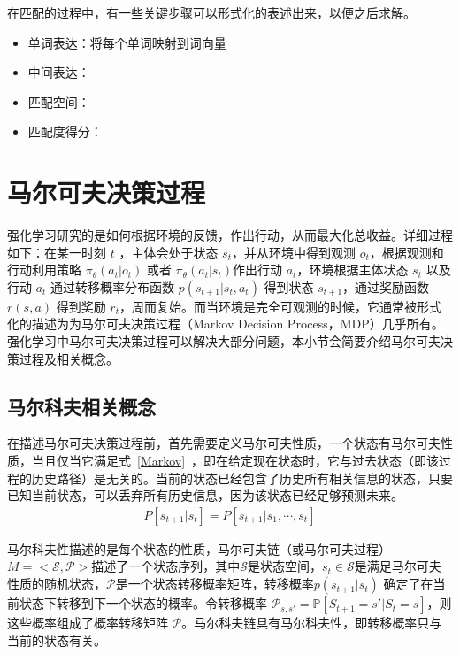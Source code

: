 在匹配的过程中，有一些关键步骤可以形式化的表述出来，以便之后求解。

\begin{itemize}
	\item 单词表达：将每个单词映射到词向量 
	\item 中间表达：
	\item 匹配空间：
	\item 匹配度得分：
\end{itemize}

\section{马尔可夫决策过程}
强化学习研究的是如何根据环境的反馈，作出行动，从而最大化总收益。详细过程如下：在某一时刻 $t$ ，主体会处于状态 $s_t$，并从环境中得到观测 $o_t$，根据观测和行动利用策略 $\pi_\theta(a_t|o_t)$ 或者 $\pi_\theta(a_t|s_t)$作出行动 $a_t$，环境根据主体状态 $s_t$ 以及行动 $a_t$ 通过转移概率分布函数 $p(s_{t+1}| s_t, a_t)$ 得到状态 $s_{t+1}$，通过奖励函数 $r(s, a)$ 得到奖励 $r_t$，周而复始。而当环境是完全可观测的时候，它通常被形式化的描述为为马尔可夫决策过程（Markov Decision Process，MDP）几乎所有。强化学习中马尔可夫决策过程可以解决大部分问题\cite{Sutton1998ReinFORcementL}，本小节会简要介绍马尔可夫决策过程及相关概念。

\subsection{马尔科夫相关概念}

在描述马尔可夫决策过程前，首先需要定义马尔可夫性质，一个状态有马尔可夫性质，当且仅当它满足式~\eqref{Markov}~，即在给定现在状态时，它与过去状态（即该过程的历史路径）是无关的。当前的状态已经包含了历史所有相关信息的状态，只要已知当前状态，可以丢弃所有历史信息，因为该状态已经足够预测未来。
\begin{equation}
\label{Markov}
\begin{aligned}
P[s_{t+1}|s_t]=P[s_{t+1}|s_1,\cdots,s_t]
\end{aligned}
\end{equation}

马尔科夫性描述的是每个状态的性质，马尔可夫链（或马尔可夫过程）$M=<\mathcal{S}, \mathcal{P}>$描述了一个状态序列，其中$\mathcal{S}$是状态空间，$s_t \in \mathcal{S}$是满足马尔可夫性质的随机状态，$\mathcal{P}$是一个状态转移概率矩阵，转移概率$p(s_{t+1}|s_t)$ 确定了在当前状态下转移到下一个状态的概率。令转移概率 $\mathcal{P}_{s, s'}=\mathbb{P}[S_{t+1}=s'|S_t=s]$，则这些概率组成了概率转移矩阵 $\mathcal{P}$。马尔科夫链具有马尔科夫性，即转移概率只与当前的状态有关。

